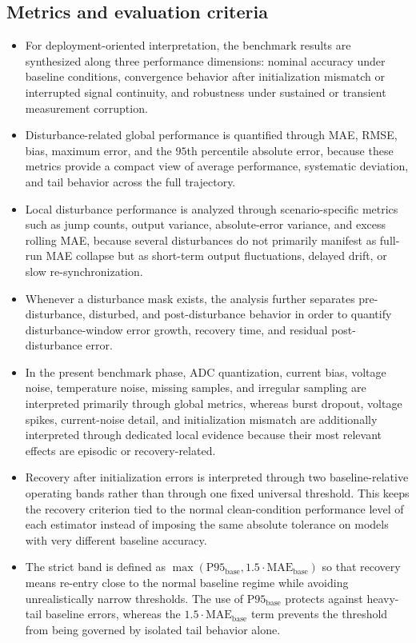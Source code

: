 \documentclass[review,nopreprintline]{elsarticle}
\begin{document}
\subsection{Metrics and evaluation criteria}
\begin{itemize}[leftmargin=*]
    \item For deployment-oriented interpretation, the benchmark results are synthesized along three performance dimensions: nominal accuracy under baseline conditions, convergence behavior after initialization mismatch or interrupted signal continuity, and robustness under sustained or transient measurement corruption.
    \item Disturbance-related global performance is quantified through MAE, RMSE, bias, maximum error, and the $95$th percentile absolute error, because these metrics provide a compact view of average performance, systematic deviation, and tail behavior across the full trajectory.
    \item Local disturbance performance is analyzed through scenario-specific metrics such as jump counts, output variance, absolute-error variance, and excess rolling MAE, because several disturbances do not primarily manifest as full-run MAE collapse but as short-term output fluctuations, delayed drift, or slow re-synchronization.
    \item Whenever a disturbance mask exists, the analysis further separates pre-disturbance, disturbed, and post-disturbance behavior in order to quantify disturbance-window error growth, recovery time, and residual post-disturbance error.
    \item In the present benchmark phase, ADC quantization, current bias, voltage noise, temperature noise, missing samples, and irregular sampling are interpreted primarily through global metrics, whereas burst dropout, voltage spikes, current-noise detail, and initialization mismatch are additionally interpreted through dedicated local evidence because their most relevant effects are episodic or recovery-related.
    \item Recovery after initialization errors is interpreted through two baseline-relative operating bands rather than through one fixed universal threshold. This keeps the recovery criterion tied to the normal clean-condition performance level of each estimator instead of imposing the same absolute tolerance on models with very different baseline accuracy.
    \item The strict band is defined as $\max(\mathrm{P95}_{\mathrm{base}},1.5 \cdot \mathrm{MAE}_{\mathrm{base}})$ so that recovery means re-entry close to the normal baseline regime while avoiding unrealistically narrow thresholds. The use of $\mathrm{P95}_{\mathrm{base}}$ protects against heavy-tail baseline errors, whereas the $1.5 \cdot \mathrm{MAE}_{\mathrm{base}}$ term prevents the threshold from being governed by isolated tail behavior alone.

\end{itemize}
\end{document}
